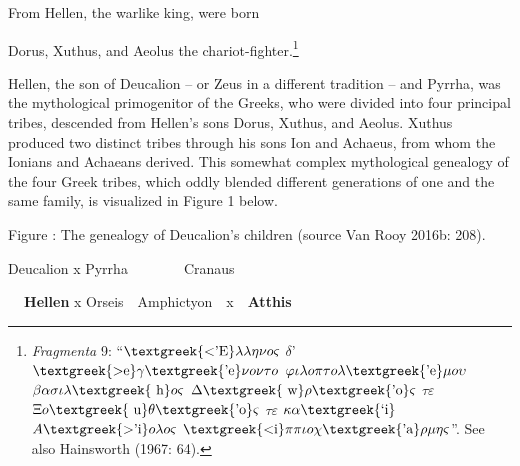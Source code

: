 \begin{styleQuote}
From Hellen, the warlike king, were born
\end{styleQuote}

\begin{styleQuote}
Dorus, Xuthus, and Aeolus the chariot-fighter.\footnote{ \textit{Fragmenta} 9: “$\text{\textgreek{<'E}}\lambda \lambda \eta \nu o\varsigma $ $\delta $’ $\text{\textgreek{>e}}\gamma \text{\textgreek{'e}}\nu o\nu \tau o$ $\varphi \iota \lambda o\pi \tau o\lambda \text{\textgreek{'e}}\mu o\upsilon $ $\beta \alpha \sigma \iota \lambda \text{\textgreek{~h}}o\varsigma $ {\textbar} $\Delta \text{\textgreek{~w}}\rho \text{\textgreek{'o}}\varsigma $ $\tau \varepsilon $ $\Xi o\text{\textgreek{~u}}\theta \text{\textgreek{'o}}\varsigma $ $\tau \varepsilon $ $\kappa \alpha \text{\textgreek{`i}}$ $A\text{\textgreek{>'i}}o\lambda o\varsigma $ $\text{\textgreek{<i}}\pi \pi \iota o\chi \text{\textgreek{'a}}\rho \mu \eta \varsigma $”. See also Hainsworth (1967: 64).}
\end{styleQuote}

\begin{styleStandard}
Hellen, the son of Deucalion – or Zeus in a different tradition – and Pyrrha, was the mythological primogenitor of the Greeks, who were divided into four principal tribes, descended from Hellen’s sons Dorus, Xuthus, and Aeolus. Xuthus produced two distinct tribes through his sons Ion and Achaeus, from whom the Ionians and Achaeans derived. This somewhat complex mythological genealogy of the four Greek tribes, which oddly blended different generations of one and the same family, is visualized in Figure 1 below.
\end{styleStandard}

\begin{stylecaption}
Figure : The genealogy of Deucalion’s children (source Van Rooy 2016b: 208).
\end{stylecaption}

\begin{styleStandard}
Deucalion x Pyrrha\ \ \ \ \ \ \ \ Cranaus
\end{styleStandard}

\begin{styleListParagraph}
\textbf{\ \ Hellen} x Orseis\ \ Amphictyon\ \ x\ \ \textbf{Atthis}
\end{styleListParagraph}

